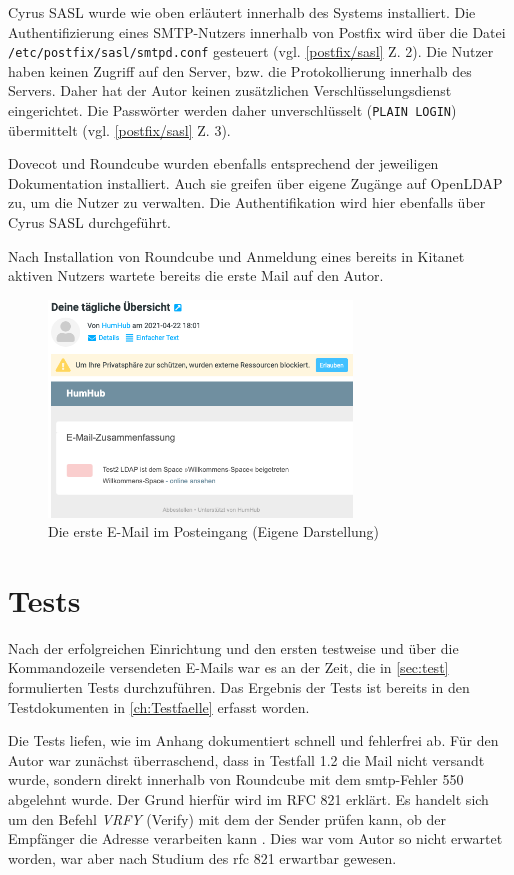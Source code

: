 Cyrus SASL wurde wie oben erläutert innerhalb des Systems installiert. 
Die Authentifizierung eines SMTP-Nutzers innerhalb von Postfix wird über die Datei\\\verb+/etc/postfix/sasl/smtpd.conf+ gesteuert (vgl. \autoref{postfix/sasl} Z. 2). 
Die Nutzer haben keinen Zugriff auf den Server, bzw. die Protokollierung innerhalb des Servers.
Daher hat der Autor keinen zusätzlichen Verschlüsselungsdienst eingerichtet. 
Die Passwörter werden daher unverschlüsselt (\verb+PLAIN LOGIN+) übermittelt (vgl. \autoref{postfix/sasl} Z. 3). 

Dovecot und Roundcube wurden ebenfalls entsprechend der jeweiligen Dokumentation installiert. Auch sie greifen über eigene Zugänge auf OpenLDAP zu, um die Nutzer zu verwalten. Die Authentifikation wird hier ebenfalls über Cyrus SASL durchgeführt.

Nach Installation von Roundcube und Anmeldung eines bereits in Kitanet aktiven Nutzers wartete bereits die erste Mail auf den Autor.

\begin{figure}[H]
  \centering
  \includegraphics[width=0.72\textwidth]{res/erste Mail.png}
  \caption{Die erste E-Mail im Posteingang (Eigene Darstellung)}
  \label{fig:Mail}
\end{figure}

\section{Tests}{}
Nach der erfolgreichen Einrichtung und den ersten testweise und über die Kommandozeile versendeten E-Mails war es an der Zeit, die in \autoref{sec:test} formulierten Tests durchzuführen. Das Ergebnis der Tests ist bereits in den Testdokumenten in \autoref{ch:Testfaelle} erfasst worden.

Die Tests liefen, wie im Anhang dokumentiert schnell und fehlerfrei ab. Für den Autor war zunächst überraschend, dass in Testfall 1.2 die Mail nicht versandt wurde, sondern direkt innerhalb von Roundcube mit dem \ac{smtp}-Fehler 550 abgelehnt wurde. 
Der Grund hierfür wird im RFC 821 erklärt. 
Es handelt sich um den Befehl \textit{VRFY} (Verify) mit dem der Sender prüfen kann, ob der Empfänger die Adresse verarbeiten kann \citep[vgl.][8]{rfc821}.
Dies war vom Autor so nicht erwartet worden, war aber nach Studium des \ac{rfc} 821 erwartbar gewesen.

